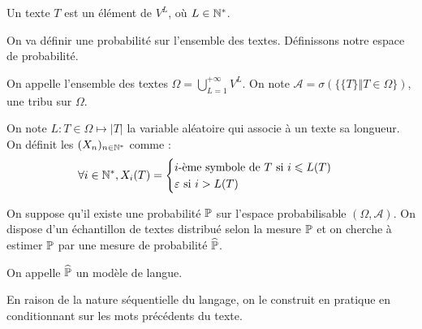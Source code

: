 \vspace{0.4cm}

\begin{definition}
Un texte $T$ est un élément de $V^L$, où $L \in \N^*$.
\end{definition}

\noindent{} On va définir une probabilité sur l'ensemble des textes.
Définissons notre espace de probabilité.

\begin{definition}
On appelle l'ensemble des textes $\Omega = \bigcup_{L=1}^{+\infty} V^L$.
On note $\mathcal{A} = \sigma\left(\{\{T\} \Vert T \in \Omega \} \right)$, une tribu sur $\Omega$.
\end{definition}

On note $L : T \in \Omega \mapsto \vert T \vert$ la variable aléatoire qui associe à un texte sa longueur.
On définit les $(X_n)_{n \in \N^*}$ comme :
\[
\forall i \in \N^*, X_i(T) = \begin{cases}
  i\text{-ème symbole de } T \text{ si } i \leq L(T) \\
  \varepsilon \text{ si } i > L(T)
\end{cases}
\]

\vspace{0.4cm}

On suppose qu'il existe une probabilité $\P$ sur l'espace probabilisable $(\Omega, \mathcal{A})$.
On dispose d'un échantillon de textes distribué selon la mesure $\P$ et on cherche à estimer $\P$ par une mesure de probabilité $\widehat{\P}$.

\begin{definition} On appelle $\widehat{\P}$ un modèle de langue.
\end{definition}

En raison de la nature séquentielle du langage, on le construit en pratique en conditionnant sur les mots précédents du texte.


